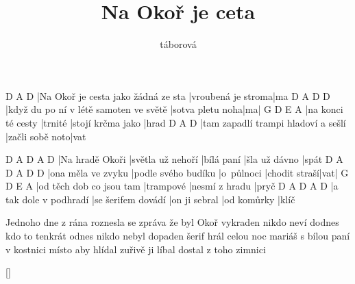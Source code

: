 \documentclass{song}
\title{Na Okoř je ceta}
\author{táborová}
\begin{document}
\strophe
D                                   A\7                D
|Na Okoř je cesta jako žádná ze sta |vroubená je stroma|ma
D                                      A\7              D  D\7
|když du po ní v létě samoten ve světě |sotva pletu noha|ma|
G                  D       E                 A\7
|na konci té cesty |trnité |stojí krčma jako |hrad
D                                   A\7             D
|tam zapadlí trampi hladoví a sešlí |začli sobě noto|vat
\endstrophe

D               A\7               D          A\7           D
|Na hradě Okoři |světla už nehoří |bílá paní |šla už dávno |spát
D                  A\7                 D          A\7           D   D\7
|ona měla ve zvyku |podle svého budíku |o~půlnoci |chodit straší|vat|
G                        D         E              A\7
|od těch dob co jsou tam |trampové |nesmí z hradu |pryč
D                      A\7                D             A\7         D
|a tak dole v podhradí |se šerifem dovádí |on ji sebral |od komůrky |klíč
\endstrophe

\strophe*
Jednoho dne z rána roznesla se zpráva že byl Okoř vykraden
nikdo neví dodnes kdo to tenkrát odnes nikdo nebyl dopaden
šerif hrál celou noc mariáš s bílou paní v kostnici
místo aby hlídal zuřivě ji líbal dostal z toho zimnici
\endstrophe

\ref{}
\end{document}
